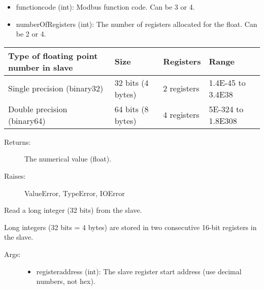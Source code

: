 \documentclass[letterpaper,10pt,english]{sphinxmanual}
\begin{document}
\begin{fulllineitems}
\begin{fulllineitems}
\begin{description}
\begin{itemize}
\item {} 
functioncode (int): Modbus function code. Can be 3 or 4.

\item {} 
numberOfRegisters (int): The number of registers allocated for the float. Can be 2 or 4.

\end{itemize}

\end{description}

\noindent\begin{tabulary}{\linewidth}{|L|L|L|L|}
\hline
\textsf{\relax 
Type of floating point number in slave
\unskip}\relax &\textsf{\relax 
Size
\unskip}\relax &\textsf{\relax 
Registers
\unskip}\relax &\textsf{\relax 
Range
\unskip}\relax \\
\hline
Single precision (binary32)
&
32 bits (4 bytes)
&
2 registers
&
1.4E-45 to 3.4E38
\\
\hline
Double precision (binary64)
&
64 bits (8 bytes)
&
4 registers
&
5E-324 to 1.8E308
\\
\hline\end{tabulary}

\begin{description}
\item[{Returns:}] \leavevmode
The numerical value (float).

\item[{Raises:}] \leavevmode
ValueError, TypeError, IOError

\end{description}

\end{fulllineitems}


\begin{fulllineitems}
\label{minimalmodbus:minimalmodbus.Instrument.read_long}
Read a long integer (32 bits) from the slave.

Long integers (32 bits = 4 bytes) are stored in two consecutive 16-bit registers in the slave.
\begin{description}
\item[{Args:}] \leavevmode\begin{itemize}
\item {} 
registeraddress (int): The slave register start address (use decimal numbers, not hex).


\end{itemize}
\end{description}
\end{fulllineitems}
\end{fulllineitems}
\end{document}
